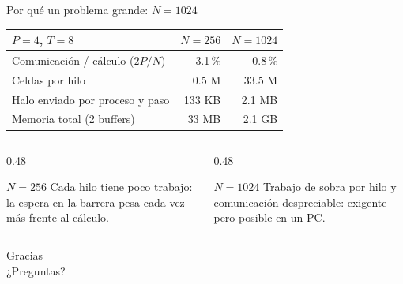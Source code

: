 \documentclass[aspectratio=169]{beamer}
\begin{document}
\begin{frame}{Por qué un problema grande: $N=1024$}
  \centering
  \footnotesize
  \begin{tabular}{lrr}
    \toprule
    $P=4$, $T=8$ & $N=256$ & $N=1024$ \\
    \midrule
    Comunicación / cálculo ($2P/N$) & 3.1\,\% & 0.8\,\% \\
    Celdas por hilo & 0.5 M & 33.5 M \\
    Halo enviado por proceso y paso & 133 KB & 2.1 MB \\
    Memoria total (2 buffers) & 33 MB & 2.1 GB \\
    \bottomrule
  \end{tabular}
  \vspace{4mm}
  \begin{columns}[T]
    \begin{column}{0.48\textwidth}
      \begin{block}{$N=256$}
        \footnotesize
        Cada hilo tiene poco trabajo: la espera en la barrera pesa cada vez
        más frente al cálculo.
      \end{block}
    \end{column}
    \begin{column}{0.48\textwidth}
      \begin{block}{$N=1024$}
        \footnotesize
        Trabajo de sobra por hilo y comunicación despreciable:
        \alert{exigente pero posible en un PC}.
      \end{block}
    \end{column}
  \end{columns}
\end{frame}

\begin{frame}
  \centering
  \Huge Gracias\\[4mm]
  \normalsize ¿Preguntas?
\end{frame}
\end{document}
